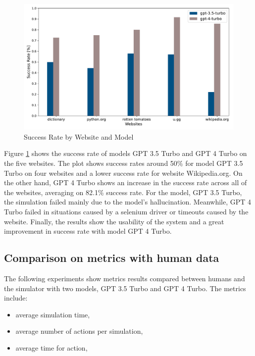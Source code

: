 \begin{figure}[H]
    \label{success}
    \centering
    \includegraphics[width=1\textwidth]{obrazky-figures/success_rate.pdf}
    \caption{Success Rate by Website and Model}
\end{figure}

Figure \ref{success} shows the success rate of models GPT 3.5 Turbo and GPT 4 Turbo on the five websites. The plot shows success rates around 50\% for model GPT 3.5 Turbo on four websites and a lower success rate for website Wikipedia.org. On the other hand, GPT 4 Turbo shows an increase in the success rate across all of the websites, averaging on 82.1\% success rate. For the model, GPT 3.5 Turbo, the simulation failed mainly due to the model's hallucination. Meanwhile, GPT 4 Turbo failed in situations caused by a selenium driver or timeouts caused by the website. Finally, the results show the usability of the system and a great improvement in success rate with model GPT 4 Turbo. 


\subsection{Comparison on metrics with human data}

The following experiments show metrics results compared between humans and the simulator with two models, GPT 3.5 Turbo and GPT 4 Turbo. The metrics include:

\begin{itemize}
    \item average simulation time,
    \item average number of actions per simulation,
    \item average time for action,
\end{itemize}


